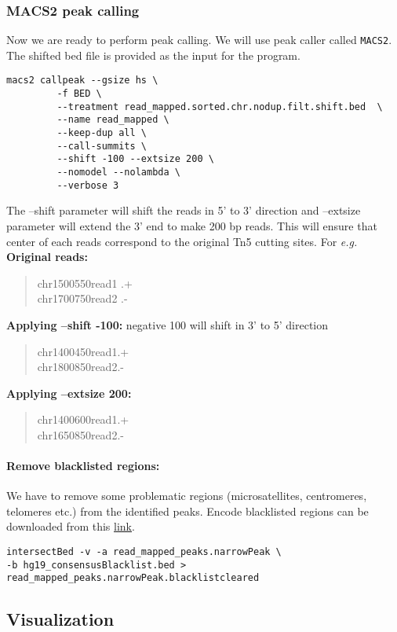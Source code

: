 \documentclass[10pt]{article}
\newcommand{\prog}[1]{\texttt{#1}}
\newcommand\tab[1][1cm]{\hspace*{#1}}
\begin{document}
\subsubsection{MACS2 peak calling} Now we are ready to perform peak calling. We will use  peak caller called \prog{MACS2}. The shifted bed file is provided as the input for the program.
\begin{verbatim}
macs2 callpeak --gsize hs \
         -f BED \
         --treatment read_mapped.sorted.chr.nodup.filt.shift.bed  \
         --name read_mapped \
         --keep-dup all \
         --call-summits \
         --shift -100 --extsize 200 \
         --nomodel --nolambda \
         --verbose 3
\end{verbatim}
The --shift parameter  will shift the reads in 5' to 3' direction and --extsize parameter will extend the 3' end to make 200 bp reads. This will ensure that center of each reads correspond to the original Tn5 cutting sites. For {\em e.g.}\\
\textbf{Original reads:}
\begin{verse}
chr1\tab 500\tab 550\tab read1 \tab .\tab +\\
chr1\tab 700\tab 750\tab read2 \tab .\tab-
\end{verse}
\textbf{Applying --shift -100:} negative 100 will shift in 3' to 5' direction
\begin{verse}
chr1\tab 400\tab 450\tab read1\tab .\tab +\\
chr1\tab 800\tab 850\tab read2\tab .\tab -
\end{verse}
\textbf{Applying --extsize 200:}
\begin{verse}
chr1\tab 400\tab 600\tab read1\tab .\tab +\\
chr1\tab 650\tab 850\tab read2\tab .\tab -
\end{verse}
\paragraph{Remove blacklisted regions:} We have to remove some problematic regions (microsatellites, centromeres, telomeres etc.) from the identified peaks. Encode blacklisted regions can be downloaded from this \href{https://sites.google.com/site/anshulkundaje/projects/blacklists}{link}.
\begin{verbatim}
intersectBed -v -a read_mapped_peaks.narrowPeak \
-b hg19_consensusBlacklist.bed > read_mapped_peaks.narrowPeak.blacklistcleared
\end{verbatim}
\subsection{Visualization}
\end{document}
